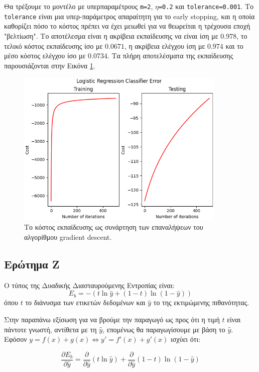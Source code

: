 \documentclass{article}
\newcommand{\code}{\texttt}
\begin{document}
Θα τρέξουμε το μοντέλο με υπερπαραμέτρους \code{m=2}, \code{$\eta$=0.2} και \code{tolerance=0.001}. Το \code{tolerance} είναι μια υπερ-παράμετρος απαραίτητη για το early stopping, και η οποία καθορίζει πόσο το κόστος πρέπει να έχει μειωθεί για να θεωρείται η τρέχουσα εποχή "βελτίωση". Το αποτέλεσμα είναι η ακρίβεια εκπαίδευσης να είναι ίση με $0.978$, το τελικό κόστος εκπαίδευσης ίσο με $0.0671$, η ακρίβεια ελέγχου ίση με $0.974$ και το μέσο κόστος ελέγχου ίσο με $0.0734$. Τα πλήρη αποτελέσματα της εκπαίδευσης παρουσιάζονται στην Εικόνα \ref{mlp_train_test}.

\begin{figure}
	\includegraphics[width=10cm]{mlp_error.png}
	\centering
	\caption{Το κόστος εκπαίδευσης ως συνάρτηση των επαναλήψεων του αλγορίθμου gradient descent.}
	\label{mlp_train_test}
\end{figure}


\subsection{Ερώτημα Ζ}

Ο τύπος της Δυαδικής Διασταυρούμενης Εντροπίας είναι:
\begin{equation}
	\label{eq:1}
	E_{b} = -(t \ln \hat{y} + (1-t) \ln(1-\hat{y}))
\end{equation}
όπου $t$ το διάνυσμα των ετικετών δεδομένων και $\hat{y}$ το της εκτιμώμενης πιθανότητας.

Στην παραπάνω εξίσωση για να βρούμε την παραγωγό ως προς  ότι η τιμή $t$ είναι πάντοτε γνωστή, αντίθετα με τη $\hat{y}$, επομένως θα παραγωγίσουμε με βάση το $\hat{y}$. Εφόσον $y = f(x) + g(x) \iff y' = f'(x) + g'(x)$ ισχύει ότι:

\begin{equation}
	\label{eq:2}
	\frac{\partial E_b}{\partial \hat{y}} = \frac{\partial}{\partial \hat{y}} (t\ln \hat{y}) + \frac{\partial}{\partial \hat{y}} (1-t) \ln (1-\hat{y})
\end{equation}
\end{document}
